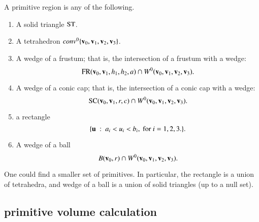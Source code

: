 \begin{definition}[primitive]\label{def:primitive} 
A primitive region is any of the following.

\begin{enumerate}%
 \item A solid triangle ${\operatorname{ST}}$.
%
 \item A tetrahedron $conv^0\{{\mathbf v}_0,{\mathbf v}_1,{\mathbf v}_2,{\mathbf v}_3\}$.
 \item A wedge of a frustum;
that is, the intersection of a frustum with
 a wedge:
    \begin{displaymath}
     {\operatorname{FR}}({\mathbf v}_0,{\mathbf v}_1,h_1,h_2,a) \cap W^0({\mathbf v}_0,{\mathbf v}_1,{\mathbf v}_2,{\mathbf v}_3).
    \end{displaymath}
\item A wedge of a conic cap; that is, the intersection of a conic cap
with
    a wedge:
    \begin{displaymath}
    {\operatorname{SC}}({\mathbf v}_0,{\mathbf v}_1,r,c) \cap W^0({\mathbf v}_0,{\mathbf v}_1,{\mathbf v}_2,{\mathbf v}_3).
    \end{displaymath}
\item a rectangle
    \begin{displaymath}
    \{{\mathbf u} \ :\  a_i < u_i < b_i,\text { for } i=1,2,3.\}.
    \end{displaymath}
\item A wedge of a ball
  \begin{displaymath}
  B({\mathbf v}_0,r) \cap W^0({\mathbf v}_0,{\mathbf v}_1,{\mathbf v}_2,{\mathbf v}_3).
  \end{displaymath}
%
%
%
%
%
%
%
\end{enumerate}
One could find a smaller set of primitives.  In particular, the
rectangle is a union of tetrahedra, and wedge of a ball is a union of solid triangles (up to a null set).  

\end{definition}

\subsection{primitive volume calculation}\label{sec:primitive}

